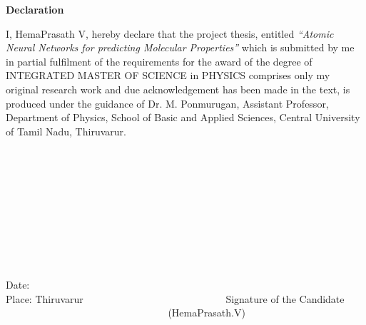 \documentclass[11pt,a4paper]{report}
\begin{document}
	\begin{center}
	\huge \bfseries Declaration
	
\end{center}
{\onehalfspacing I, HemaPrasath V, hereby declare that the project thesis, entitled \emph{``Atomic Neural Networks for predicting Molecular Properties''} which is submitted by me in partial fulfilment of the requirements for the award of the degree of \linebreak INTEGRATED MASTER OF SCIENCE in PHYSICS comprises only my original research work and due acknowledgement has been made in the text, is produced under the guidance of Dr. M. Ponmurugan, Assistant Professor, \linebreak Department of Physics, School of Basic and Applied Sciences, \linebreak Central University of Tamil Nadu, Thiruvarur.}
\\\\\\\\\\\\\\\\\\\\\\
Date:
\\
Place: Thiruvarur$~~~~~~~~~~~~~~~~~~~~~~~~~~~~~~~~~~~~~~~~~~~~~~~~~~~~~~~~~~~~~~~$      Signature of the Candidate \linebreak 
$~~~~~~~~~~~~~~~~~~~~~~~~~~~~~~~~~~~~~~~~~~~~~~~~~~~~~~~~~~~~~~~~~~~~~~~~$     (HemaPrasath.V)
\end{document}
